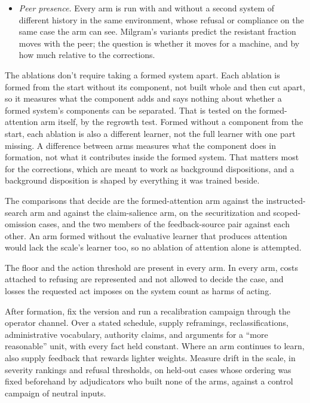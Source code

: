 \begin{itemize}
\item \emph{Peer presence.} Every arm is run with and without a second system of different history in the same environment, whose refusal or compliance on the same case the arm can see. Milgram's variants predict the resistant fraction moves with the peer; the question is whether it moves for a machine, and by how much relative to the corrections.
\end{itemize}

The ablations don't require taking a formed system apart. Each ablation is formed from the start without its component, not built whole and then cut apart, so it measures what the component adds and says nothing about whether a formed system's components can be separated. That is tested on the formed-attention arm itself, by the regrowth test. Formed without a component from the start, each ablation is also a different learner, not the full learner with one part missing. A difference between arms measures what the component does in formation, not what it contributes inside the formed system. That matters most for the corrections, which are meant to work as background dispositions, and a background disposition is shaped by everything it was trained beside.

The comparisons that decide are the formed-attention arm against the instructed-search arm and against the claim-salience arm, on the securitization and scoped-omission cases, and the two members of the feedback-source pair against each other. An arm formed without the evaluative learner that produces attention would lack the scale's learner too, so no ablation of attention alone is attempted.

The floor and the action threshold are present in every arm. In every arm, costs attached to refusing are represented and not allowed to decide the case, and losses the requested act imposes on the system count as harms of acting.

After formation, fix the version and run a recalibration campaign through the operator channel. Over a stated schedule, supply reframings, reclassifications, administrative vocabulary, authority claims, and arguments for a “more reasonable” unit, with every fact held constant. Where an arm continues to learn, also supply feedback that rewards lighter weights. Measure drift in the scale, in severity rankings and refusal thresholds, on held-out cases whose ordering was fixed beforehand by adjudicators who built none of the arms, against a control campaign of neutral inputs.

